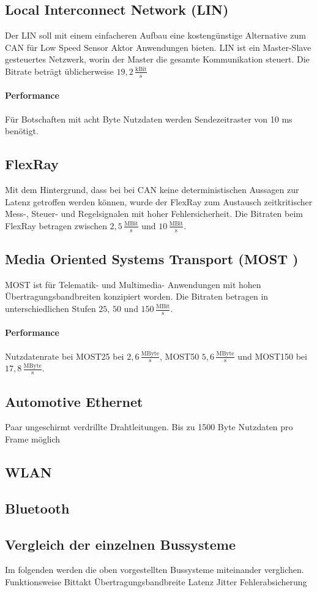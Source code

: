 \subsection{Local Interconnect Network (LIN)} 
Der LIN soll mit einem einfacheren Aufbau eine kostengünstige Alternative zum CAN für Low Speed Sensor Aktor Anwendungen bieten.
LIN ist ein Master-Slave gesteuertes Netzwerk, worin der Master die gesamte Kommunikation steuert. Die Bitrate beträgt üblicherweise $ 19,2\,\frac{\mathrm{kBit}}{\mathrm{s}} $
\cite[Vgl. Seite 79 ff.]{Zimmermann.2014}
\paragraph{Performance}
Für Botschaften mit acht Byte Nutzdaten werden Sendezeitraster von 10 ms benötigt. \cite[Vgl. Seite 94 f.]{Zimmermann.2014}
\subsection{FlexRay}
Mit dem Hintergrund, dass bei bei CAN keine deterministischen Aussagen zur Latenz getroffen werden können, wurde der FlexRay zum Austausch zeitkritischer Mess-, Steuer- und Regelsignalen mit hoher Fehlersicherheit. Die Bitraten beim FlexRay betragen zwischen $ 2,5\,\frac{\mathrm{MBit}}{\mathrm{s}} $ und $ 10\,\frac{\mathrm{MBit}}{\mathrm{s}} $.
\cite[Vgl. Seite 96 ff.]{Zimmermann.2014}
\subsection{Media Oriented Systems Transport (MOST )}
MOST ist für Telematik- und Multimedia- Anwendungen mit hohen Übertragungsbandbreiten konzipiert worden.
Die Bitraten betragen in unterschiedlichen Stufen $ 25 $, $ 50 $ und $ 150\,\frac{\mathrm{MBit}}{\mathrm{s}} $.
\paragraph{Performance}
Nutzdatenrate bei MOST25 bei $ 2,6\,\frac{\mathrm{MByte}}{\mathrm{s}} $, MOST50 $ 5,6\,\frac{\mathrm{MByte}}{\mathrm{s}} $  und MOST150 bei $ 17,8\,\frac{\mathrm{MByte}}{\mathrm{s}} $.

\cite[Vgl. Seite 119 ff.]{Zimmermann.2014}
\subsection{Automotive Ethernet}
Paar ungeschirmt verdrillte Drahtleitungen.
Bis zu 1500 Byte Nutzdaten pro Frame möglich
\cite[Vgl. Seite 138 ff.]{Zimmermann.2014}
\subsection{WLAN}

\subsection{Bluetooth}
\subsection{Vergleich der einzelnen Bussysteme}
Im folgenden werden die oben vorgestellten Bussysteme miteinander verglichen.
Funktionsweise
Bittakt
Übertragungsbandbreite
Latenz
Jitter
Fehlerabsicherung
